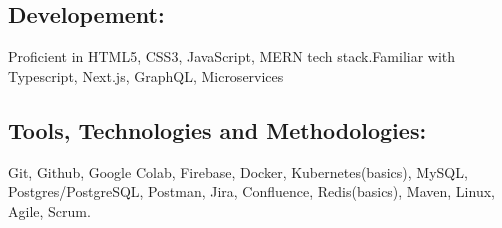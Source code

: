 \documentclass{article}
\begin{document}
\subsection*{Developement:}
Proficient in HTML5, CSS3, JavaScript, MERN tech stack.Familiar with Typescript, Next.js, GraphQL, Microservices

\subsection*{Tools, Technologies and Methodologies:}
Git, Github, Google Colab, Firebase, Docker, Kubernetes(basics), MySQL, Postgres/PostgreSQL, Postman, Jira, Confluence, Redis(basics), Maven, Linux, Agile, Scrum.




\end{document}
